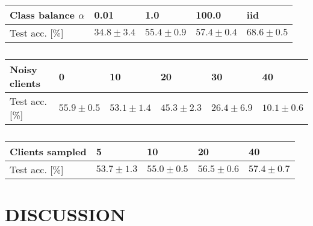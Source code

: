 \documentclass{article}
\begin{document}
\begin{table}
        \small
        \begin{center}
                \begin{tabular}{l l l l l}
                        Class balance $\alpha$ & 0.01 & 1.0 & 100.0 & iid \\
                        \hline
                        Test acc. [\%] & $34.8 \pm 3.4$ & $55.4 \pm 0.9$ & $57.4 \pm 0.4$ & $68.6 \pm 0.5$ \\
                \end{tabular}
        \end{center}
        \caption{}
        \label{tab:alpha}
\end{table}
\begin{table}
        \footnotesize
        \begin{center}
                \begin{tabular}{l l l l l l}
                        Noisy clients & 0 & 10 & 20 & 30 & 40 \\
                        \hline
                        Test acc. [\%] & $55.9 \pm 0.5$ & $53.1 \pm 1.4$ & $45.3 \pm 2.3$ & $26.4 \pm 6.9$ & $10.1 \pm 0.6$ \\
                \end{tabular}
        \end{center}
        \caption{}
        \label{tab:noisy_clients}
\end{table}
\begin{table}
        \small
        \begin{center}
                \begin{tabular}{l l l l l}
                        Clients sampled & 5 & 10 & 20 & 40 \\
                        \hline
                        Test acc. [\%] & $53.7 \pm 1.3$ & $55.0 \pm 0.5$ & $56.5 \pm 0.6$ & $57.4 \pm 0.7$ \\
                \end{tabular}
        \end{center}
        \caption{}
        \label{tab:clients_per_round}
\end{table}

\section{DISCUSSION}%
\label{sec:discussion}

\vfill
\pagebreak



\end{document}
